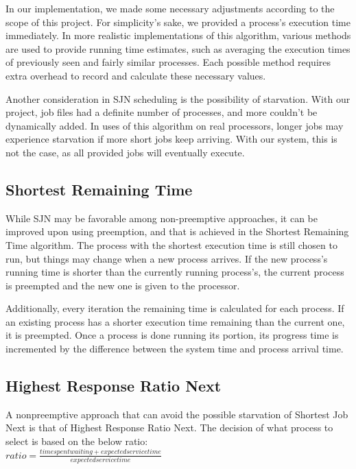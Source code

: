 \documentclass[conference,11pt]{IEEEtran}
\begin{document}
In our implementation, we made some necessary adjustments according to the scope of this project. For simplicity's sake, we provided a process's execution time immediately. In more realistic implementations of this algorithm, various methods are used to provide running time estimates, such as averaging the execution times of previously seen and fairly similar processes\cite{Silberschatz}. Each possible method requires extra overhead to record and calculate these necessary values.

Another consideration in SJN scheduling is the possibility of starvation. With our project, job files had a definite number of processes, and more couldn't be dynamically added. In uses of this algorithm on real processors, longer jobs may experience starvation if more short jobs keep arriving. With our system, this is not the case, as all provided jobs will eventually execute.

\subsection{Shortest Remaining Time}
While SJN may be favorable among non-preemptive approaches, it can be improved upon using preemption, and that is achieved in the Shortest Remaining Time algorithm. The process with the shortest execution time is still chosen to run, but things may change when a new process arrives. If the new process's running time is shorter than the currently running process's, the current process is preempted and the new one is given to the processor.

Additionally, every iteration the remaining time is calculated for each process. If an existing process has a shorter execution time remaining than the current one, it is preempted. Once a process is done running its portion, its progress time is incremented by the difference between the system time and process arrival time.

\subsection{Highest Response Ratio Next}
A nonpreemptive approach that can avoid the possible starvation of Shortest Job Next is that of Highest Response Ratio Next. The decision of what process to select is based on the below ratio: \\

\begin{math}
ratio = \frac{time spent waiting + expected service time}{expected service time}
\end{math}\\
\end{document}
